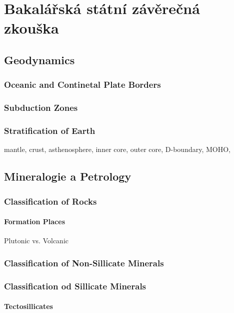 
\part{Bakalářská státní závěrečná zkouška}

\chapter{Geodynamics}

\section{Oceanic and Continetal Plate Borders}

\section{Subduction Zones}

\section{Stratification of Earth}

mantle, crust, asthenosphere, inner core, outer core, D-boundary, MOHO, 

\chapter{Mineralogie a Petrology}

\section{Classification of Rocks}

\subsection{Formation Places}

Plutonic vs. Volcanic

\section{Classification of Non-Sillicate Minerals}

\section{Classification od Sillicate Minerals}

\subsection{Tectosillicates}

